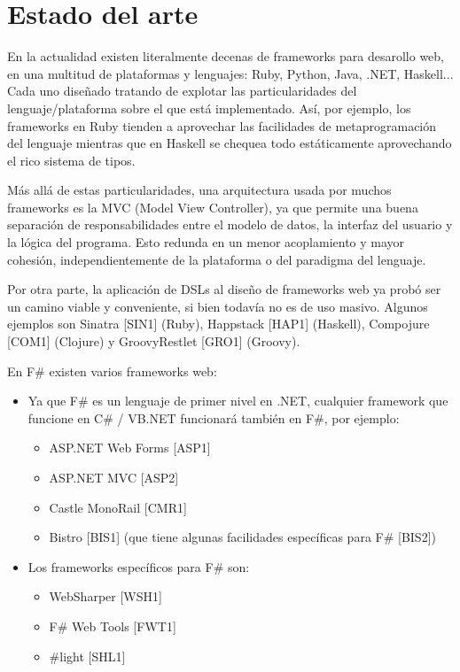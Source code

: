\documentclass[12pt]{article}
\begin{document}
\section{Estado del arte}

En la actualidad existen literalmente decenas de frameworks para desarollo web, en una multitud de plataformas y lenguajes: Ruby, Python, Java, .NET, Haskell... Cada uno diseñado tratando de explotar las particularidades del lenguaje/plataforma sobre el que está implementado. Así, por ejemplo, los frameworks en Ruby tienden a aprovechar las facilidades de metaprogramación del lenguaje mientras que en Haskell se chequea todo estáticamente aprovechando el rico sistema de tipos.

Más allá de estas particularidades, una arquitectura usada por muchos frameworks es la MVC (Model View Controller), ya que permite una buena separación de responsabilidades entre el modelo de datos, la interfaz del usuario y la lógica del programa. Esto redunda en un menor acoplamiento y mayor cohesión, independientemente de la plataforma o del paradigma del lenguaje.

Por otra parte, la aplicación de DSLs al diseño de frameworks web ya probó ser un camino viable y conveniente, si bien todavía no es de uso masivo. Algunos ejemplos son Sinatra [SIN1] (Ruby), Happstack [HAP1] (Haskell), Compojure [COM1] (Clojure) y GroovyRestlet [GRO1] (Groovy).

En F\# existen varios frameworks web:

\begin{itemize}
	\item Ya que F\# es un lenguaje de primer nivel en .NET, cualquier framework que funcione en C\# / VB.NET funcionará también en F\#, por ejemplo:
	\begin{itemize}
		\item ASP.NET Web Forms [ASP1]
		\item ASP.NET MVC [ASP2]
		\item Castle MonoRail [CMR1]
		\item Bistro [BIS1] (que tiene algunas facilidades específicas para F\# [BIS2])
	\end{itemize}
	\item Los frameworks específicos para F\# son:
	\begin{itemize}
		\item WebSharper [WSH1]
		\item F\# Web Tools [FWT1]
		\item \#light [SHL1]
	\end{itemize}
\end{itemize}
\end{document}
